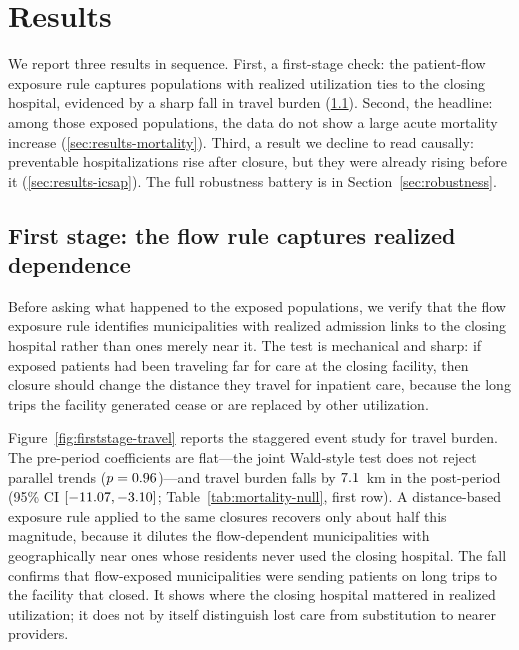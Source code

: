 \section{Results}
\label{sec:results}

We report three results in sequence. First, a first-stage check: the
patient-flow exposure rule captures populations with realized utilization
ties to the closing hospital, evidenced by a sharp fall in travel burden
(\ref{sec:results-firststage}). Second, the headline: among those
exposed populations, the data do not show a large acute mortality
increase (\ref{sec:results-mortality}). Third, a result we decline to
read causally: preventable hospitalizations rise after closure, but they
were already rising before it (\ref{sec:results-icsap}). The full
robustness battery is in Section~\ref{sec:robustness}.

\subsection{First stage: the flow rule captures realized dependence}
\label{sec:results-firststage}

Before asking what happened to the exposed populations, we verify that
the flow exposure rule identifies municipalities with realized admission
links to the closing hospital rather than ones merely near it. The test is
mechanical and sharp: if exposed patients had been traveling far for
care at the closing facility, then closure should change the distance
they travel for inpatient care, because the long trips the facility
generated cease or are replaced by other utilization.

Figure~\ref{fig:firststage-travel} reports the staggered event study for
travel burden. The pre-period coefficients are flat---the joint
Wald-style test does not reject parallel trends ($p = 0.96$)---and travel
burden falls by $7.1$~km in the post-period (95\% CI $[-11.07, -3.10]$;
Table~\ref{tab:mortality-null}, first row). A distance-based exposure
rule applied to the same closures recovers only about half this
magnitude, because it dilutes the flow-dependent municipalities
with geographically near ones whose residents never used the closing
hospital. The fall confirms that flow-exposed municipalities were
sending patients on long trips to the facility that closed. It shows
where the closing hospital mattered in realized utilization; it does not
by itself distinguish lost care from substitution to nearer providers.


